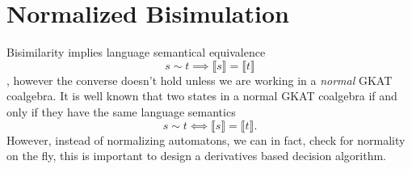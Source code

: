 \documentclass[acmsmall,screen]{acmart}
\newtheorem{lemma}{Lemma}
\newtheorem{definition}{Definition}
\begin{document}





\section{Normalized Bisimulation}

Bisimilarity implies language semantical equivalence \[s ∼ t ⟹ ⟦s⟧ = ⟦t⟧\], however the converse doesn't hold unless we are working in a \emph{normal} GKAT coalgebra.
It is well known that two states in a normal GKAT coalgebra if and only if they have the same language semantics \[s ∼ t ⟺ ⟦s⟧ = ⟦t⟧.\]
However, instead of normalizing automatons, we can in fact, check for normality on the fly, this is important to design a derivatives based decision algorithm.
\end{document}
